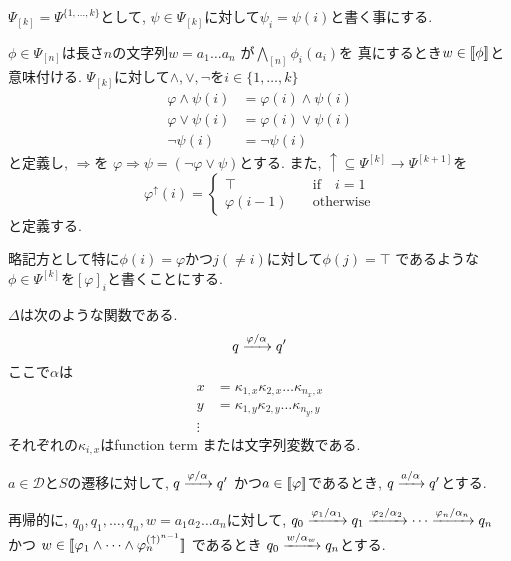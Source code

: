 \documentclass[uplatex,dvipdfmx,a4j]{jsreport}
\begin{document}
\begin{definition}
    $\Psi_{[k]} = \Psi^{\{ 1, \ldots, k \}}$として,
    $\psi \in \Psi_{[k]}$に対して$\psi_i = \psi(i)$と書く事にする.

    $\phi \in \Psi_{[n]}$は長さ$n$の文字列$w = a_1 \ldots a_n$
    が$\bigwedge_{[n]} \phi_i(a_i)$を
    真にするとき$w \in {[ \! [{\phi}] \! ]}$と意味付ける.
    $\Psi_{[k]}$に対して$\land, \lor, \lnot$を$i \in \{ 1, \ldots, k \}$
    \begin{align*}
      \varphi \land \psi (i) &= \varphi(i) \land \psi(i) \\
      \varphi \lor \psi (i) &= \varphi(i) \lor \psi(i) \\
      \lnot \psi (i) &= \lnot \psi(i)
    \end{align*}
    と定義し, $\Rightarrow$を
    $\varphi \Rightarrow \psi = (\lnot \varphi \lor \psi)$とする.
    また, $\uparrow \subseteq \Psi^{[k]} \rightarrow \Psi^{[k + 1]}$を
    \[
      \varphi^\uparrow(i) =
        \begin{cases}
          \top \quad &\mbox{if} \quad i = 1 \\
          \varphi(i - 1) \quad &\mbox{otherwise}
        \end{cases}
    \]
    と定義する.

    略記方として特に$\phi(i) = \varphi$かつ$j (\neq i)$に対して$\phi(j) = \top$
    であるような$\phi \in \Psi^{[k]}$を$[\varphi]_i$と書くことにする.

    $\Delta$は次のような関数である.
    \[
      q \xrightarrow[]{\varphi / \alpha} q'
    \]
    ここで$\alpha$は
    \begin{align*}
      x &= \kappa_{1, x} \kappa_{2, x} \ldots \kappa_{n_x, x} \\
      y &= \kappa_{1, y} \kappa_{2, y} \ldots \kappa_{n_y, y} \\
      \vdots &
    \end{align*}
    それぞれの$\kappa_{i, x}$はfunction term または文字列変数である.

    $a \in \mathcal{D}$と$S$の遷移に対して, $q \xrightarrow[]{\varphi / \alpha} q'$
    かつ$a \in {[ \! [{\varphi}] \! ]}$であるとき, $q \xrightarrow[]{a / \alpha} q'$とする.

    再帰的に, $q_0, q_1, \ldots, q_n, w = a_1 a_2 \ldots a_n$に対して,
    $q_0 \xrightarrow[]{\varphi_1 / \alpha_1} q_1 \xrightarrow[]{\varphi_2 / \alpha_2}
    \cdots \xrightarrow[]{\varphi_n / \alpha_n} q_n$
    かつ
    $w \in {[ \! [{\varphi_1 \land \cdots \land \varphi_n^{(\uparrow)^{n - 1}}}] \! ]}$
    であるとき
    $q_0 \xrightarrow[]{w / \alpha_w} q_n$とする.


\end{definition}
\end{document}
